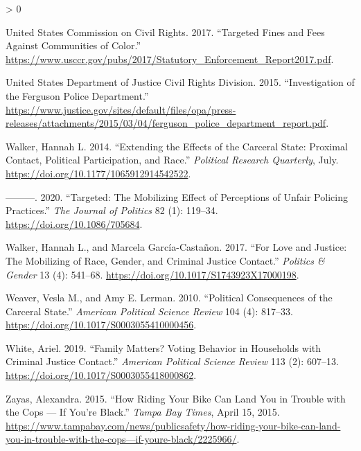 \documentclass[
  12pt,
]{article}
\newlength{\cslhangindent}
\newenvironment{CSLReferences}[2] %
 {%
  \setlength{\parindent}{0pt}
  \ifodd #1 \everypar{\setlength{\hangindent}{\cslhangindent}}\ignorespaces\fi
  \ifnum #2 > 0
  \setlength{\parskip}{#2\baselineskip}
  \fi
 }%
 {}
\begin{document}
\begin{CSLReferences}{1}{0}
\leavevmode\hypertarget{ref-UnitedStatesCommissiononCivilRights2017}{}%
United States Commission on Civil Rights. 2017. {``Targeted {Fines} and {Fees Against Communities} of {Color}.''} \url{https://www.usccr.gov/pubs/2017/Statutory_Enforcement_Report2017.pdf}.

\leavevmode\hypertarget{ref-UnitedStatesDepartmentofJusticeCivilRightsDivision2015}{}%
United States Department of Justice Civil Rights Division. 2015. {``Investigation of the {Ferguson Police Department}.''} \url{https://www.justice.gov/sites/default/files/opa/press-releases/attachments/2015/03/04/ferguson_police_department_report.pdf}.

\leavevmode\hypertarget{ref-Walker2014}{}%
Walker, Hannah L. 2014. {``Extending the {Effects} of the {Carceral State}: {Proximal Contact}, {Political Participation}, and {Race}.''} \emph{Political Research Quarterly}, July. \url{https://doi.org/10.1177/1065912914542522}.

\leavevmode\hypertarget{ref-Walker2020}{}%
---------. 2020. {``Targeted: {The Mobilizing Effect} of {Perceptions} of {Unfair Policing Practices}.''} \emph{The Journal of Politics} 82 (1): 119--34. \url{https://doi.org/10.1086/705684}.

\leavevmode\hypertarget{ref-Walker2017}{}%
Walker, Hannah L., and Marcela García-Castañon. 2017. {``For {Love} and {Justice}: {The Mobilizing} of {Race}, {Gender}, and {Criminal Justice Contact}.''} \emph{Politics \& Gender} 13 (4): 541--68. \url{https://doi.org/10.1017/S1743923X17000198}.

\leavevmode\hypertarget{ref-Weaver2010}{}%
Weaver, Vesla M., and Amy E. Lerman. 2010. {``Political {Consequences} of the {Carceral State}.''} \emph{American Political Science Review} 104 (4): 817--33. \url{https://doi.org/10.1017/S0003055410000456}.

\leavevmode\hypertarget{ref-White2019}{}%
White, Ariel. 2019. {``Family {Matters}? {Voting Behavior} in {Households} with {Criminal Justice Contact}.''} \emph{American Political Science Review} 113 (2): 607--13. \url{https://doi.org/10.1017/S0003055418000862}.

\leavevmode\hypertarget{ref-Zayas2015}{}%
Zayas, Alexandra. 2015. {``How Riding Your Bike Can Land You in Trouble with the Cops --- If You're Black.''} \emph{Tampa Bay Times}, April 15, 2015. \url{https://www.tampabay.com/news/publicsafety/how-riding-your-bike-can-land-you-in-trouble-with-the-cops—if-youre-black/2225966/}.

\end{CSLReferences}
\end{document}
